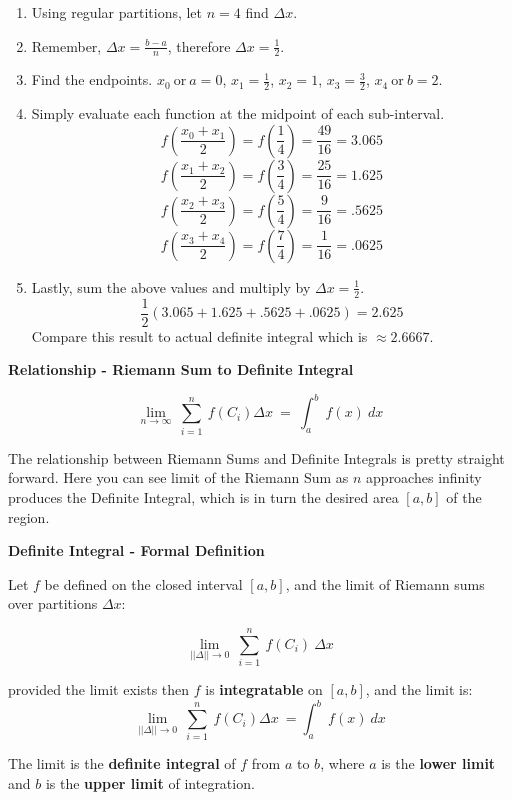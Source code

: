 \documentclass[12pt]{article}
\begin{document}
\begin{enumerate}
\item Using regular partitions, let $n = 4$ find $\Delta x$. 
\item Remember, $\Delta x = \frac{b - a}{n}$, therefore $\Delta x = \frac{1}{2}$.
\item Find the endpoints. $x_0 \ \text{or} \ a = 0$, $x_1 = \frac{1}{2}$, $x_2 = 1$, $x_3 = \frac{3}{2}$, $x_4 \ \text{or} \ b = 2$.
\item Simply evaluate each function at the midpoint of each sub-interval. \color{mypink}
$$ f(\frac{x_0 + x_1}{2}) = f(\frac{1}{4}) = \frac{49}{16} = 3.065$$
$$ f(\frac{x_1 + x_2}{2}) = f(\frac{3}{4}) = \frac{25}{16} = 1.625$$
$$ f(\frac{x_2 + x_3}{2}) = f(\frac{5}{4}) = \frac{9}{16} = .5625$$
$$ f(\frac{x_3 + x_4}{2}) = f(\frac{7}{4}) = \frac{1}{16} = .0625$$ \color{black}
\item Lastly, sum the above values and multiply by $\Delta x = \frac{1}{2}$. \color{mypink}
$$ \frac{1}{2} (3.065 + 1.625 + .5625 + .0625) = 2.625$$
\color{black}
Compare this result to actual definite integral which is \color{myblue} $\approx 2.6667$\color{black}.
\end{enumerate}
\color{black} 

\bigskip

\large\noindent\textbf{Relationship - Riemann Sum to Definite Integral}

$$ \lim_{n\to \infty} \  \sum_{i=1}^{n} \ f(C_i)\Delta x \ = \ \int^b_a \ f(x) \ dx $$ 

\normalsize
\noindent The relationship between Riemann Sums and Definite Integrals is pretty straight forward. Here you can see limit of the Riemann Sum as $n$ approaches infinity produces the Definite Integral, which is in turn the desired area $[a, b]$ of the region.


\newpage

\bigskip

\begin{tcolorbox}[colback = lightgray!75!white,
				  sharp corners = all,
				  colframe = lightgray!75!white]
\textbf{\large Definite Integral - Formal Definition}

\bigskip

Let $f$ be defined on the closed interval $[a,b]$, and the limit of Riemann sums over partitions $\Delta x$:

\bigskip
$$ \lim_{||\Delta||\to 0} \  \sum_{i=1}^{n}  \ f(C_i) \ \Delta x $$ 

\bigskip

provided the limit exists then $f$ is
\bigskip
\textbf{integratable} on $[a, b]$, and the limit is:
$$ \lim_{||\Delta||\to 0} \  \sum_{i=1}^{n} \ f(C_i)\Delta x \ = \int^b_a \ f(x) \  dx $$

\bigskip

The limit is the \textbf{definite integral} of $f$ from $a$ to $b$, where $a$ is the \textbf{lower limit} and $b$ is the \textbf{upper limit} of integration.
\end{tcolorbox}
\end{document}
